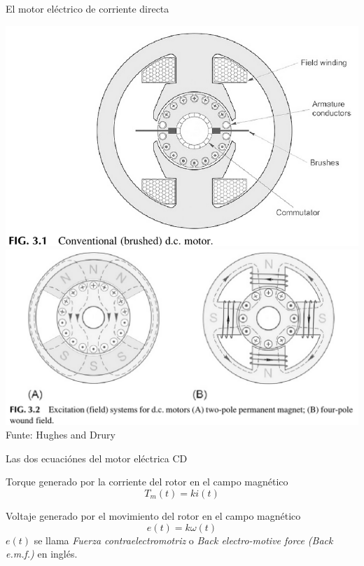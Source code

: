 \documentclass[presentation,aspectratio=169]{beamer}
\begin{document}
\begin{frame}[label={sec:org0669b8d}]{El motor eléctrico de corriente directa}
\begin{center}
\includegraphics[width=0.4\linewidth]{../../figures/HD-fig3_1.png}
\includegraphics[width=0.53\linewidth]{../../figures/HD-fig3_2.png}
{\footnotesize Funte: Hughes and Drury}
\end{center}
\end{frame}



\begin{frame}[label={sec:orgccf2bdc}]{Las dos ecuaciónes del motor eléctrica CD}
\begin{block}{Torque generado por la corriente del rotor en el campo magnético}
\[ T_m(t) = k i(t) \]
\end{block}

\begin{block}{Voltaje generado por el movimiento del rotor en el campo magnético}
\[ e(t) = k \omega(t)\]
\(e(t)\) se llama \emph{Fuerza contraelectromotriz} o \emph{Back electro-motive force (Back e.m.f.)} en inglés.
\end{block}
\end{frame}
\end{document}
